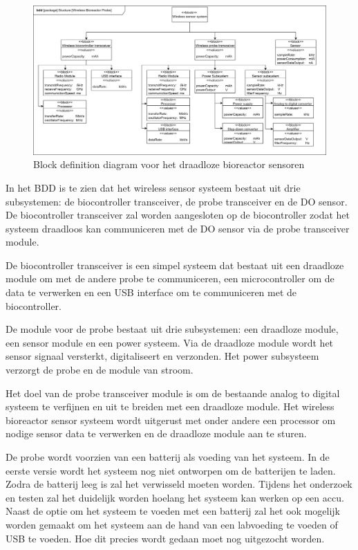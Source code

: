 \begin{figure}[H]
	\centering
	\includegraphics[width=1.0\linewidth]{graphics/sensor_bdd}
	\caption{Block definition diagram voor het draadloze bioreactor sensoren}
	\label{fig:sensor_bdd}
\end{figure}
In het BDD is te zien dat het wireless sensor systeem bestaat uit drie subsystemen: de biocontroller transceiver, de probe transceiver en de DO sensor. De biocontroller transceiver zal worden aangesloten op de biocontroller zodat het systeem draadloos kan communiceren met de DO sensor via de probe transceiver module. 

De biocontroller transceiver is een simpel systeem dat bestaat uit een draadloze module om met de andere probe te communiceren, een microcontroller om de data te verwerken en een USB interface om te communiceren met de biocontroller. 

De module voor de probe bestaat uit drie subsystemen: een draadloze module, een sensor module en een power systeem. Via de draadloze module wordt het sensor signaal versterkt, digitaliseert en verzonden. Het power subsysteem verzorgt de probe en de module van stroom. 

Het doel van de probe transceiver module is om de bestaande analog to digital systeem te verfijnen en uit te breiden met een draadloze module. Het wireless bioreactor sensor systeem wordt uitgerust met onder andere een processor om nodige sensor data te verwerken en de draadloze module aan te sturen.  

De probe wordt voorzien van een batterij als voeding van het systeem. In de eerste versie wordt het systeem nog niet ontworpen om de batterijen te laden. Zodra de batterij leeg is zal het verwisseld moeten worden. Tijdens het onderzoek en testen zal het duidelijk worden hoelang het systeem kan werken op een accu. Naast de optie om het systeem te voeden met een batterij zal het ook mogelijk worden gemaakt om het systeem aan de hand van een labvoeding te voeden of USB te voeden. Hoe dit precies wordt gedaan moet nog uitgezocht worden. 

